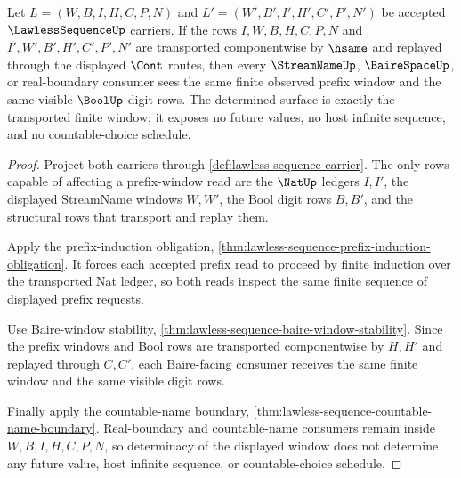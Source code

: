 \begin{theorem}
\label{thm:lawless-sequence-prefix-window-determinacy}
Let $L=(W,B,I,H,C,P,N)$ and $L'=(W',B',I',H',C',P',N')$ be accepted $\LawlessSequenceUp$ carriers. If the rows $I,W,B,H,C,P,N$ and $I',W',B',H',C',P',N'$ are transported componentwise by $\hsame$ and replayed through the displayed $\Cont$ routes, then every $\StreamNameUp$, $\BaireSpaceUp$, or real-boundary consumer sees the same finite observed prefix window and the same visible $\BoolUp$ digit rows. The determined surface is exactly the transported finite window; it exposes no future values, no host infinite sequence, and no countable-choice schedule.
\end{theorem}
\begin{proof}
Project both carriers through \autoref{def:lawless-sequence-carrier}. The only rows capable of affecting a prefix-window read are the $\NatUp$ ledgers $I,I'$, the displayed StreamName windows $W,W'$, the Bool digit rows $B,B'$, and the structural rows that transport and replay them.

Apply the prefix-induction obligation, \autoref{thm:lawless-sequence-prefix-induction-obligation}. It forces each accepted prefix read to proceed by finite induction over the transported Nat ledger, so both reads inspect the same finite sequence of displayed prefix requests.

Use Baire-window stability, \autoref{thm:lawless-sequence-baire-window-stability}. Since the prefix windows and Bool rows are transported componentwise by $H,H'$ and replayed through $C,C'$, each Baire-facing consumer receives the same finite window and the same visible digit rows.

Finally apply the countable-name boundary, \autoref{thm:lawless-sequence-countable-name-boundary}. Real-boundary and countable-name consumers remain inside $W,B,I,H,C,P,N$, so determinacy of the displayed window does not determine any future value, host infinite sequence, or countable-choice schedule.
\end{proof}

